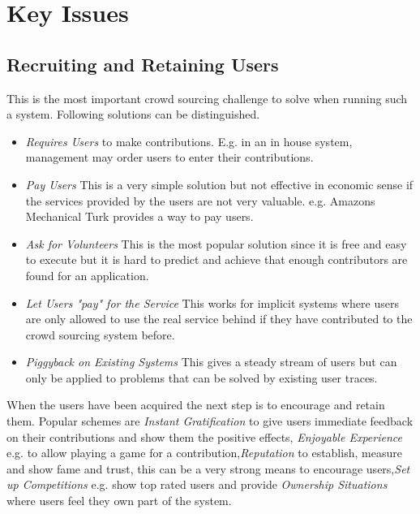 \documentclass{sig-alternate}
\begin{document}
\section{Key Issues}
\subsection{Recruiting and Retaining Users}
This is the most important crowd sourcing challenge to solve when running such a system. Following solutions can be distinguished.
\begin{itemize}
\item \textit{Requires Users} to make contributions. E.g. in an in house system, management may order users to enter their contributions.
\item \textit{Pay Users} This is a very simple solution but not effective in economic sense if the services provided by the users are not very valuable. e.g. Amazons Mechanical Turk provides a way to pay users.
\item \textit{Ask for Volunteers} This is the most popular solution since it is free and easy to execute but it is hard to predict and achieve that enough contributors are found for an application.
\item \textit{Let Users "pay" for the Service} This works for implicit systems where users are only allowed to use the real service behind if they have contributed to the crowd sourcing system before.
\item \textit{Piggyback on Existing Systems} This gives a steady stream of users but can only be applied to problems that can be solved by existing user traces.
\end{itemize}
When the users have been acquired the next step is to encourage and retain them. Popular schemes are \textit{Instant Gratification} to give users immediate feedback on their contributions and show them the positive effects, \textit{Enjoyable Experience} e.g. to allow playing a game for a contribution,\textit{Reputation} to establish, measure and show fame and trust, this can be a very strong means to encourage users,\textit{Set up Competitions} e.g. show top rated users and provide \textit{Ownership Situations} where users feel they own part of the system.
\end{document}
